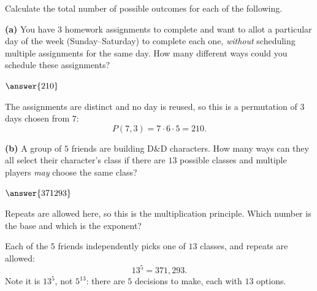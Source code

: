 \documentclass[12pt]{ximera}
\begin{document}
\begin{problem}
Calculate the total number of possible outcomes for each of the following.

\begin{prompt}
\textbf{(a)} You have $3$ homework assignments to complete and want to allot a
particular day of the week (Sunday--Saturday) to complete each one, \emph{without}
scheduling multiple assignments for the same day. How many different ways could you
schedule these assignments?

$\answer{210}$

\begin{feedback}
The assignments are distinct and no day is reused, so this is a permutation of $3$
days chosen from $7$:
\[ P(7,3)=7\cdot 6\cdot 5 = 210. \]
\end{feedback}
\end{prompt}

\begin{prompt}
\textbf{(b)} A group of $5$ friends are building D\&D characters. How many ways can
they all select their character's class if there are $13$ possible classes and
multiple players \emph{may} choose the same class?

$\answer{371293}$

\begin{hint}
Repeats are allowed here, so this is the multiplication principle. Which number is
the base and which is the exponent?
\end{hint}

\begin{feedback}
Each of the $5$ friends independently picks one of $13$ classes, and repeats are
allowed:
\[ 13^5 = 371{,}293. \]
Note it is $13^5$, not $5^{13}$: there are $5$ decisions to make, each with $13$
options.
\end{feedback}
\end{prompt}
\end{problem}
\end{document}
